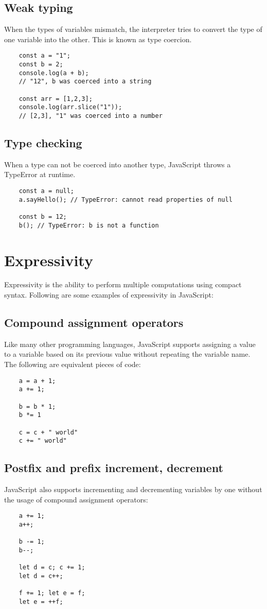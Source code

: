 \documentclass[11pt,a4paper]{article}
\begin{document}
\subsection{Weak typing}
When the types of variables mismatch, the interpreter tries to convert the type of one variable into the other.
This is known as type coercion.
\begin{verbatim}
    const a = "1";
    const b = 2;
    console.log(a + b);
    // "12", b was coerced into a string

    const arr = [1,2,3];
    console.log(arr.slice("1"));
    // [2,3], "1" was coerced into a number
\end{verbatim}

\subsection{Type checking}
When a type can not be coerced into another type, JavaScript throws a TypeError at runtime.
\begin{verbatim}
    const a = null;
    a.sayHello(); // TypeError: cannot read properties of null

    const b = 12;
    b(); // TypeError: b is not a function
\end{verbatim}

\section{Expressivity}
Expressivity is the ability to perform multiple computations using compact syntax.
Following are some examples of expressivity in JavaScript:

\subsection{Compound assignment operators}
Like many other programming languages, JavaScript supports assigning a value to a variable based on its previous value
without repeating the variable name. The following are equivalent pieces of code:
\begin{verbatim}
    a = a + 1;
    a += 1;

    b = b * 1;
    b *= 1

    c = c + " world"
    c += " world"
\end{verbatim}

\subsection{Postfix and prefix increment, decrement}
JavaScript also supports incrementing and decrementing variables by one without the usage of compound assignment
operators:
\begin{verbatim}
    a += 1;
    a++;

    b -= 1;
    b--;

    let d = c; c += 1;
    let d = c++;

    f += 1; let e = f;
    let e = ++f;
\end{verbatim}
\end{document}
